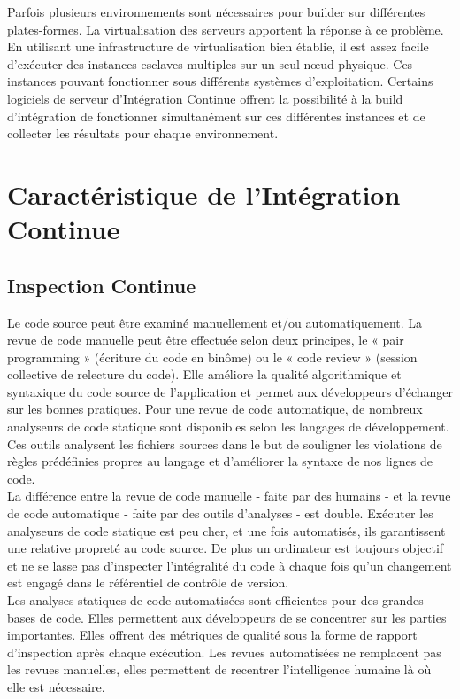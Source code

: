     Parfois plusieurs environnements sont nécessaires pour builder sur différentes plates-formes. La virtualisation des serveurs apportent la réponse à ce problème. En utilisant une infrastructure de virtualisation bien établie, il est assez facile d’exécuter des instances esclaves multiples sur un seul nœud physique. Ces instances pouvant fonctionner sous différents systèmes d’exploitation. Certains logiciels de serveur d’Intégration Continue offrent la possibilité à la build d’intégration de fonctionner simultanément sur ces différentes instances et de collecter les résultats pour chaque environnement.\\

  \section{Caractéristique de l’Intégration Continue}\label{Features of Continuous Integration}
    \subsection{Inspection Continue}
    Le code source peut être examiné manuellement et/ou automatiquement. La revue de code manuelle peut être effectuée selon deux principes, le « pair programming » (écriture du code en binôme) ou le « code review » (session collective de relecture du code). Elle améliore la qualité algorithmique et syntaxique du code source de l’application et permet aux développeurs d’échanger sur les bonnes pratiques. Pour une revue de code automatique, de nombreux analyseurs de code statique sont disponibles selon les langages de développement. Ces outils analysent les fichiers sources dans le but de souligner les violations de règles prédéfinies propres au langage et d’améliorer la syntaxe de nos lignes de code.\\

    La différence entre la revue de code manuelle - faite par des humains - et la revue de code automatique - faite par des outils d’analyses - est double. Exécuter les analyseurs de code statique est peu cher, et une fois automatisés, ils garantissent une relative propreté au code source. De plus un ordinateur est toujours objectif et ne se lasse pas d’inspecter l’intégralité du code à chaque fois qu’un changement est engagé dans le référentiel de contrôle de version.\\

    Les analyses statiques de code automatisées sont efficientes pour des grandes bases de code. Elles permettent aux développeurs de se concentrer sur les parties importantes. Elles offrent des métriques de qualité sous la forme de rapport d’inspection après chaque exécution. Les revues automatisées ne remplacent pas les revues manuelles, elles permettent de recentrer l’intelligence humaine là où elle est nécessaire.\\


